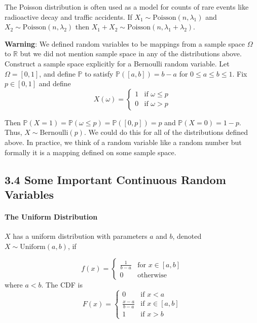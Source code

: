 The Poisson distribution is often used as a model for counts of rare events like radioactive decay and traffic accidents. If \(X_{1} \sim \text{Poisson}(n, \lambda_{1})\) and \(X_{2} \sim \text{Poisson}(n, \lambda_{2})\) then \(X_{1} + X_{2} \sim \text{Poisson}(n, \lambda_{1} + \lambda_{2})\).

\textbf{Warning}: We defined random variables to be mappings from a sample space \(\Omega\) to \(\mathbb{R}\) but we did not mention sample space in any of the distributions above. Construct a sample space explicitly for a Bernoulli random variable. Let \(\Omega = [0, 1]\), and define \(\mathbb{P}\) to satisfy \(\mathbb{P}([a, b]) = b - a\) for \(0 \leq a \leq b \leq 1\). Fix \(p \in [0, 1]\) and define
\[
X(\omega) = 
\begin{cases}
1 &\text{if }\omega \leq p 
\\
0 &\text{if }\omega > p
\end{cases}
\]

Then \(\mathbb{P}(X = 1) = \mathbb{P}(\omega \leq p) = \mathbb{P}([0, p]) = p\) and \(\mathbb{P}(X = 0) = 1 - p\). Thus, \(X \sim \text{Bernoulli}(p)\). We could do this for all of the distributions defined above. In practice, we think of a random variable like a random number but formally it is a mapping defined on some sample space.

\subsection*{3.4 Some Important Continuous Random Variables}\label{some-important-continuous-random-variables}

\paragraph{The Uniform Distribution}\label{the-uniform-distribution}

\(X\) has a uniform distribution with parameters \(a\) and \(b\), denoted \(X \sim \text{Uniform}(a, b)\), if

\[
f(x) = 
\begin{cases}
\displaystyle\frac{1}{b - a} &\text{for } x \in [a, b]
\\[1ex]
0 &\text{otherwise}
\end{cases}
\]
where \(a < b\). The CDF is
\[
F(x) = 
\begin{cases}
0 &\text{if } x < a 
\\[1ex]
\displaystyle\frac{x - a}{b - a} &\text{if } x \in [a, b] 
\\[1ex]
1 &\text{if } x > b
\end{cases}
\]


